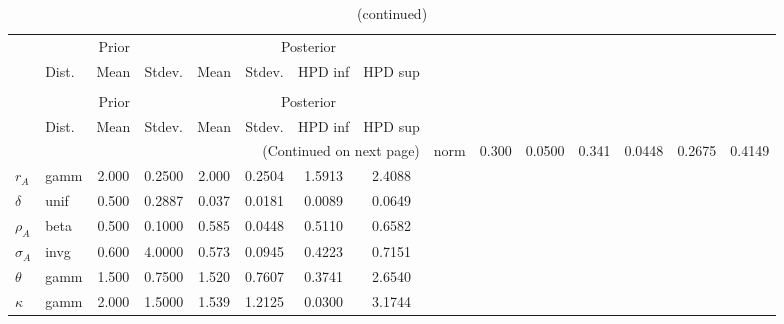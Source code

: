  
\begin{center}
\begin{longtable}{llcccccc} 
\caption{Results from Metropolis-Hastings (parameters)}
 \label{Table:MHPosterior:1}\\
\toprule 
  & \multicolumn{3}{c}{Prior}  &  \multicolumn{4}{c}{Posterior} \\
  \cmidrule(r{.75em}){2-4} \cmidrule(r{.75em}){5-8}
  & Dist. & Mean  & Stdev. & Mean & Stdev. & HPD inf & HPD sup\\
\midrule \endfirsthead 
\caption{(continued)}\\\toprule 
  & \multicolumn{3}{c}{Prior}  &  \multicolumn{4}{c}{Posterior} \\
  \cmidrule(r{.75em}){2-4} \cmidrule(r{.75em}){5-8}
  & Dist. & Mean  & Stdev. & Mean & Stdev. & HPD inf & HPD sup\\
\midrule \endhead 
\bottomrule \multicolumn{8}{r}{(Continued on next page)} \endfoot 
\bottomrule \endlastfoot 
${\alpha}$ & norm &   0.300 & 0.0500 &   0.341& 0.0448 &  0.2675 &  0.4149 \\ 
${r_{A}}$ & gamm &   2.000 & 0.2500 &   2.000& 0.2504 &  1.5913 &  2.4088 \\ 
${\delta}$ & unif &   0.500 & 0.2887 &   0.037& 0.0181 &  0.0089 &  0.0649 \\ 
${\rho_A}$ & beta &   0.500 & 0.1000 &   0.585& 0.0448 &  0.5110 &  0.6582 \\ 
${\sigma_A}$ & invg &   0.600 & 4.0000 &   0.573& 0.0945 &  0.4223 &  0.7151 \\ 
${\theta}$ & gamm &   1.500 & 0.7500 &   1.520& 0.7607 &  0.3741 &  2.6540 \\ 
${\kappa}$ & gamm &   2.000 & 1.5000 &   1.539& 1.2125 &  0.0300 &  3.1744 \\ 
\end{longtable}
 \end{center}
